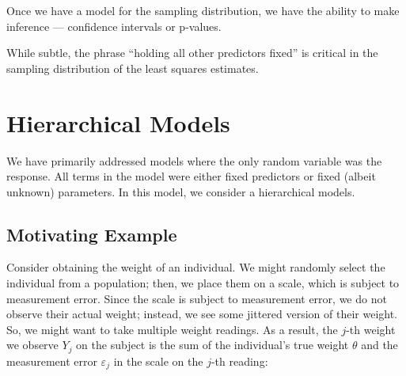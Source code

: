 \documentclass[
  letterpaper,
  DIV=11,
  numbers=noendperiod]{scrreprt}
\theoremstyle{definition}
\theoremstyle{plain}
\theoremstyle{definition}
\theoremstyle{remark}
\begin{document}
Once we have a model for the sampling distribution, we have the ability
to make inference --- confidence intervals or p-values.

\begin{tcolorbox}[enhanced jigsaw, breakable, colframe=quarto-callout-important-color-frame, titlerule=0mm, arc=.35mm, coltitle=black, opacitybacktitle=0.6, leftrule=.75mm, opacityback=0, left=2mm, toprule=.15mm, colbacktitle=quarto-callout-important-color!10!white, title=\textcolor{quarto-callout-important-color}{\faExclamation}\hspace{0.5em}{Important}, bottomtitle=1mm, toptitle=1mm, rightrule=.15mm, bottomrule=.15mm, colback=white]

While subtle, the phrase ``holding all other predictors fixed'' is
critical in the sampling distribution of the least squares estimates.

\end{tcolorbox}


\chapter{Hierarchical Models}\label{sec-hierarchical-models}

\providecommand{\norm}[1]{\left\lVert#1\right\rVert}
\providecommand{\abs}[1]{\left\lvert#1\right\rvert}
\providecommand{\dist}[1]{\stackrel{\text{#1}}{\sim}}
\providecommand{\ind}[1]{\mathbb{I}\left(#1\right)}
\providecommand{\bm}[1]{\mathbf{#1}}
\providecommand{\bs}[1]{\boldsymbol{#1}}
\providecommand{\Ell}{\mathcal{L}}
\providecommand{\indep}{\perp\negthickspace\negmedspace\perp}

We have primarily addressed models where the only random variable was
the response. All terms in the model were either fixed predictors or
fixed (albeit unknown) parameters. In this model, we consider a
hierarchical models.

\section{Motivating Example}\label{motivating-example}

Consider obtaining the weight of an individual. We might randomly select
the individual from a population; then, we place them on a scale, which
is subject to measurement error. Since the scale is subject to
measurement error, we do not observe their actual weight; instead, we
see some jittered version of their weight. So, we might want to take
multiple weight readings. As a result, the \(j\)-th weight we observe
\(Y_j\) on the subject is the sum of the individual's true weight
\(\theta\) and the measurement error \(\varepsilon_j\) in the scale on
the \(j\)-th reading:
\end{document}

